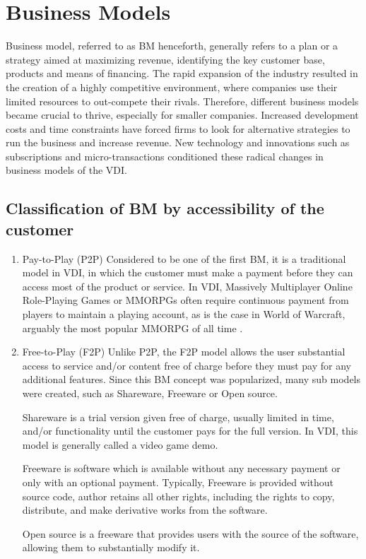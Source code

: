 \documentclass[10pt,british,a4paper,titlepage]{article}
\begin{document}
\section{Business Models} 
Business model, referred to as BM henceforth, generally refers to a plan or a strategy aimed at maximizing revenue, identifying the key customer base, products and means of financing. The rapid expansion of the industry resulted in the creation of a highly competitive environment, where companies use their limited resources to out-compete their rivals\cite{osathanunkul2015classification:business}. Therefore, different business models became crucial to thrive, especially for smaller companies. Increased development costs and time constraints have forced firms to look for alternative strategies to run the business and increase revenue. New technology and innovations such as subscriptions and micro-transactions conditioned these radical changes in business models of the VDI\cite{osathanunkul2015classification:business}.



\subsection{Classification of BM by accessibility of the customer}
\begin{enumerate} 

\item Pay-to-Play (P2P)
Considered to be one of the first BM, it is a traditional model in VDI, in which the customer must make a payment before they can access most of the product or service. In VDI, Massively Multiplayer Online Role-Playing Games or MMORPGs often require continuous payment from players to maintain a playing account, as is the case in World of Warcraft, arguably the most popular MMORPG of all time \cite{IGN:WOW}.

\item Free-to-Play (F2P) 
Unlike P2P, the F2P model allows the user substantial access to service and/or content free of charge before they must pay for any additional features. Since this BM concept was popularized, many sub models were created, such as Shareware, Freeware or Open source.

Shareware is a trial version given free of charge, usually limited in time, and/or functionality until the customer pays for the full version. In VDI, this model is generally called a video game demo\cite{osathanunkul2015classification:business}.

Freeware is software which is available without any necessary payment or only with an optional payment. Typically, Freeware is provided without source code, author retains all other rights, including the rights to copy, distribute, and make derivative works from the software\cite{Graham:LBCI}.

Open source is a freeware that provides users with the source of the software, allowing them to substantially modify it. 

\end{enumerate}
\end{document}
